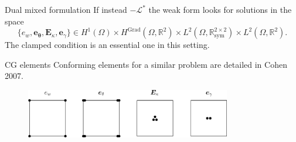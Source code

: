 \documentclass[aspectratio=169]{ISAE-Beamer}
\DeclareMathOperator*{\Grad}{Grad}
\newcommand{\bbR}{\mathbb{R}}
\begin{document}
\begin{frame}{Dual mixed formulation}
\setlength{\abovedisplayskip}{3pt}
\setlength{\belowdisplayskip}{3pt}
If instead $-\mathcal{L}^*$ the weak form looks for solutions in the space
$$\{e_w, \bm{e}_{\bm{\theta}}, \bm{E}_{\kappa}, \bm{e}_{\gamma}\} \in H^{1}(\Omega) \times H^{\Grad}(\Omega, \bbR^2) \times L^2(\Omega, \bbR^{2\times 2}_{\text{sym}}) \times L^2(\Omega, \bbR^2).$$
The clamped condition is an essential one in this setting.
\begin{block}{CG elements}
Conforming elements for a similar problem are detailed in Cohen 2007.
\begin{figure}
	\centering
	\includegraphics[width=0.8\textwidth]{presentation/fe_CG.eps}
\end{figure}
		
\end{block}

\end{frame}
\end{document}

